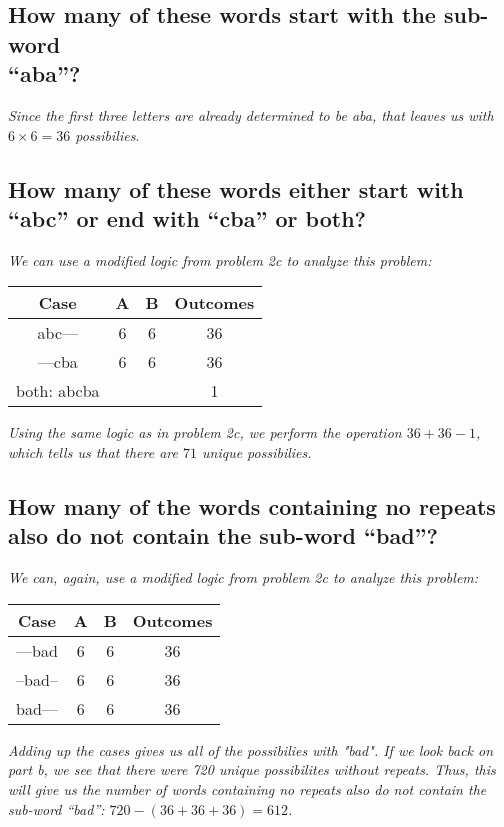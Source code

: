 \documentclass{article}
\begin{document}
\subsection{How many of these words start with the sub-word \\ “aba”?}
\hspace{1cm}\textit{Since the first three letters are already determined to be aba, that leaves us with
    $6\times 6 = 36$ possibilies.}
\clearpage
\subsection{How many of these words either start with “abc” or end with “cba” or both?}
\hspace{1cm}\textit{We can use a modified logic from problem 2c to analyze this problem:}
\begin{center}
    \begin{tabular}{c|c|c|c}
        Case & A & B & Outcomes \\
        \hline
        abc--- & 6 & 6 & 36 \\
        \hline
        ---cba & 6 & 6 & 36 \\
        \hline
        both: abcba &  &  & 1 \\
        \hline
    \end{tabular}
\end{center}
\hspace{1cm}\textit{Using the same logic as in problem 2c, we perform the operation $36+36-1$,
    which tells us that there are $71$ unique possibilies.}
\subsection{How many of the words containing no repeats also do not contain the sub-word “bad”?}
\hspace{1cm}\textit{We can, again, use a modified logic from problem 2c to analyze this problem:}
\begin{center}
     \begin{tabular}{c|c|c|c}
         Case & A & B & Outcomes \\
         \hline
         ---bad & 6 & 6 & 36 \\
         \hline
         --bad-- & 6 & 6 & 36 \\
         \hline
         bad--- & 6 & 6 & 36 \\
         \hline
     \end{tabular}
 \end{center}
 \hspace{1cm}\textit{Adding up the cases gives us all of the possibilies with "bad". If we look back
    on part b, we see that there were 720 unique possibilites without repeats. Thus, this will give us
    the number of words containing no repeats also do not contain the sub-word “bad”:
    $720-(36+36+36) = 612$.}
\end{document}
